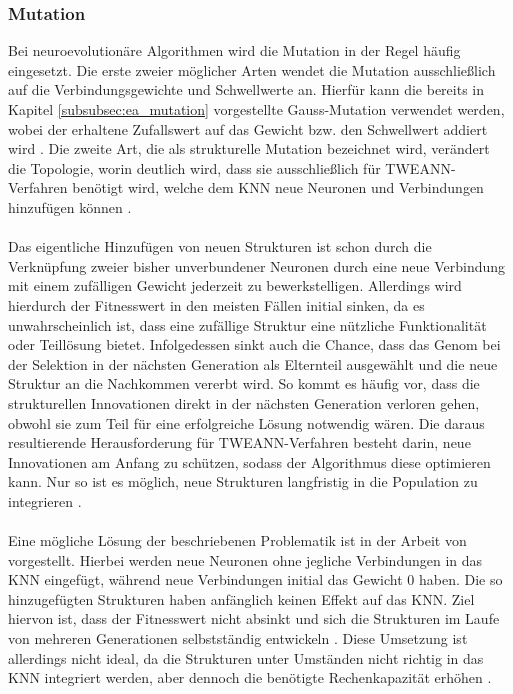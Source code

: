 \subsubsection{Mutation}
\label{subsubsec:mutation}
Bei neuroevolutionäre Algorithmen wird die Mutation in der Regel häufig eingesetzt. Die erste zweier möglicher Arten wendet die Mutation ausschließlich auf die Verbindungsgewichte und Schwellwerte an. Hierfür kann die bereits in Kapitel \ref{subsubsec:ea_mutation} vorgestellte Gauss-Mutation verwendet werden, wobei der erhaltene Zufallswert auf das Gewicht bzw. den Schwellwert addiert wird \cite{mcintyre_neatpython}. Die zweite Art, die als strukturelle Mutation bezeichnet wird, verändert die Topologie, worin deutlich wird, dass sie ausschließlich für \ac{TWEANN}-Verfahren benötigt wird, welche dem \ac{KNN} neue Neuronen und Verbindungen hinzufügen können \cite{stanley2002evolving}.
\\\\
Das eigentliche Hinzufügen von neuen Strukturen ist schon durch die Verknüpfung zweier bisher unverbundener Neuronen durch eine neue Verbindung mit einem zufälligen Gewicht jederzeit zu bewerkstelligen. Allerdings wird hierdurch der Fitnesswert in den meisten Fällen initial sinken, da es unwahrscheinlich ist, dass eine zufällige Struktur eine nützliche Funktionalität oder Teillösung bietet. Infolgedessen sinkt auch die Chance, dass das Genom bei der Selektion in der nächsten Generation als Elternteil ausgewählt und die neue Struktur an die Nachkommen vererbt wird. So kommt es häufig vor, dass die strukturellen Innovationen direkt in der nächsten Generation verloren gehen, obwohl sie zum Teil für eine erfolgreiche Lösung notwendig wären. Die daraus resultierende Herausforderung für \ac{TWEANN}-Verfahren besteht darin, neue Innovationen am Anfang zu schützen, sodass der Algorithmus diese optimieren kann. Nur so ist es möglich, neue Strukturen langfristig in die Population zu integrieren \cite{stanley2002evolving}.
\\\\
Eine mögliche Lösung der beschriebenen Problematik ist in der Arbeit von \citeauthor{angeline1994gnarl} vorgestellt. Hierbei werden neue Neuronen ohne jegliche Verbindungen in das \ac{KNN} eingefügt, während neue Verbindungen initial das Gewicht $0$ haben. Die so hinzugefügten Strukturen haben anfänglich keinen Effekt auf das \ac{KNN}. Ziel hiervon ist, dass der Fitnesswert nicht absinkt und sich die Strukturen im Laufe von mehreren Generationen selbstständig entwickeln \cite{angeline1994gnarl}. Diese Umsetzung ist allerdings nicht ideal, da die Strukturen unter Umständen nicht richtig in das \ac{KNN} integriert werden, aber dennoch die benötigte Rechenkapazität erhöhen \cite{stanley2002evolving}.
